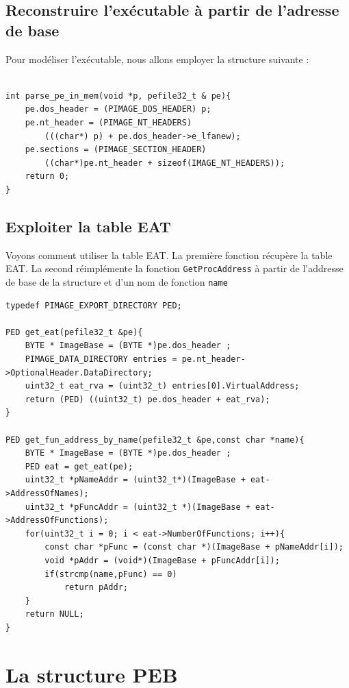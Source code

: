 \documentclass{book}
\newcommand{\code}[1]{\texttt{#1}}
\begin{document}
\subsection{Reconstruire l'exécutable à partir de l'adresse de base}

Pour modéliser l'exécutable, nous allons employer la structure suivante : 

\begin{verbatim}

int parse_pe_in_mem(void *p, pefile32_t & pe){
	pe.dos_header = (PIMAGE_DOS_HEADER) p;
	pe.nt_header = (PIMAGE_NT_HEADERS) 
		(((char*) p) + pe.dos_header->e_lfanew);
	pe.sections = (PIMAGE_SECTION_HEADER) 
		((char*)pe.nt_header + sizeof(IMAGE_NT_HEADERS));
	return 0;
}
\end{verbatim}


\subsection{Exploiter la table EAT}

Voyons comment utiliser la table EAT. La première fonction récupère la table EAT. La second réimplémente la fonction \code{GetProcAddress} à partir de l'addresse de base de la structure et d'un nom de fonction \code{name}

\begin{verbatim}
typedef PIMAGE_EXPORT_DIRECTORY PED;

PED get_eat(pefile32_t &pe){
	BYTE * ImageBase = (BYTE *)pe.dos_header ;
	PIMAGE_DATA_DIRECTORY entries = pe.nt_header->OptionalHeader.DataDirectory;
	uint32_t eat_rva = (uint32_t) entries[0].VirtualAddress;
	return (PED) ((uint32_t) pe.dos_header + eat_rva);
}

PED get_fun_address_by_name(pefile32_t &pe,const char *name){
	BYTE * ImageBase = (BYTE *)pe.dos_header ;
	PED eat = get_eat(pe);
	uint32_t *pNameAddr = (uint32_t*)(ImageBase + eat->AddressOfNames);
	uint32_t *pFuncAddr = (uint32_t *)(ImageBase + eat->AddressOfFunctions);
	for(uint32_t i = 0; i < eat->NumberOfFunctions; i++){
		const char *pFunc = (const char *)(ImageBase + pNameAddr[i]);
		void *pAddr = (void*)(ImageBase + pFuncAddr[i]);
		if(strcmp(name,pFunc) == 0)
			return pAddr;
	}
	return NULL;
}
\end{verbatim}


\section{La structure PEB}
\end{document}
